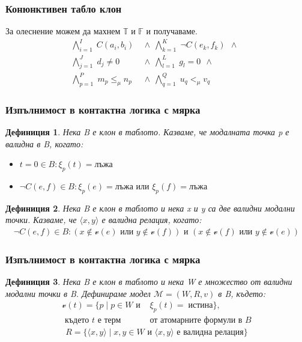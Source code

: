 \documentclass{beamer}
\newtheorem{defn}{Дефиниция}[section]
\newcommand{\vE}{\mathscr{v}}
\newcommand{\vBool}{\xi}
\newcommand{\signT}{\mathbb{T}}
\newcommand{\signF}{\mathbb{F}}
\begin{document}
\begin{frame}\frametitle{Конюнктивен табло клон}
		За олеснение можем да махнем $\signT \textit{ и } \signF$ и получаваме.
\begin{align*}
			\bigwedge_{i=1}^{I} \; C(a_i, b_i) \:\: & \wedge \:\: 
			\bigwedge_{k=1}^{K} \; \neg C(e_k, f_k) \:\: \wedge \:\: \\
			\bigwedge_{j=1}^{J} \; d_j \neq 0 \:\: & \wedge \:\:
			\bigwedge_{l=1}^{L} \; g_l = 0 \:\: \wedge \:\:\\
			\bigwedge_{p=1}^{P} \; m_p \le_\mu n_p \:\: &\wedge \:\:
			\bigwedge_{q=1}^{Q} \; u_q <_\mu v_q \:\:
\end{align*}%
\end{frame}

\begin{frame}\frametitle{Изпълнимост в контактна логика с мярка}
	\begin{defn}%
	Нека B е клон в таблото. Казваме, че модалната точка p е валидна в B, когато:
	\begin{itemize}
		\item $t = 0 \in B:  \vBool_{p}(t) = \textbf{лъжа}$
		\item $\neg C(e, f) \in B: \vBool_{p}(e) = \textbf{лъжа} \textit{ или } \vBool_{p}(f) = \textbf{лъжа}$
	\end{itemize}
	\end{defn}

	\begin{defn}
		Нека B е клон в таблото и нека x и y са две валидни модални точки. Казваме, че $\langle x, y \rangle$ е валидна релация, когато:
		\begin{align*}
				\neg C(e, f) \in B: (x \notin \vE(e) \textit{ или } y \notin \vE(f)) \textit{ и } (x \notin \vE(f) \textit{ или } y \notin \vE(e))
		\end{align*}
	\end{defn}
\end{frame}

\begin{frame}\frametitle{Изпълнимост в контактна логика с мярка}
	\begin{defn}
Нека B е клон в таблото и нека W е множество от валидни модални точки в B. Дефинираме модел $\mathcal{M} = (W, R, v)$ в B, където:
		\begin{align*}
				\vE(t) = \{ p \; | \; p \in W \textit{ и } &\vBool_{p}(t) =\; \textit{истина} \}, \\
				\textit{ където t е терм } & \textit{от атомарните формули в B}
		\end{align*}
		\begin{align*}
				R = \{ \langle x, y \rangle\; | \; x, y \in W \textit{ и } \langle x, y \rangle \textit{ е валидна релация}\}
		\end{align*}
	\end{defn}
\end{frame}
\end{document}
